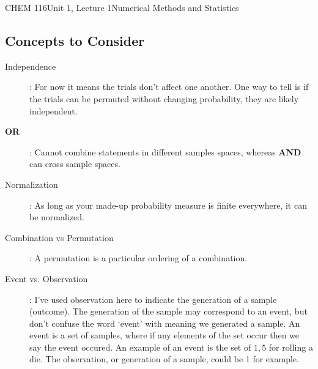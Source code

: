 \documentclass{article}
\begin{document}
\begin{tdoc}{CHEM 116}{Unit 1, Lecture 1}{Numerical Methods and Statistics}
\subsection{Concepts to Consider}

\begin{description}

\item [Independence]: For now it means the trials don't affect one
another. One way to tell is if the trials can be permuted without changing probability, they are likely
independent.\vspace{0.2cm}\\

\item[{\bf OR}]: Cannot combine statements in different samples spaces, whereas {\bf AND} can cross sample spaces.\vspace{0.2cm}\\

\item[Normalization]: As long as your made-up probability measure is
finite everywhere, it can be normalized.

\item[Combination vs Permutation]: A permutation is a particular
  ordering of a combination.

\item[Event vs. Observation]: I've used observation here to indicate
  the generation of a sample (outcome). The generation of the sample
  may correspond to an event, but don't confuse the word `event' with
  meaning we generated a sample. An event is a set of samples, where
  if any elements of the set occur then we say the event occured. An
  example of an event is the set of ${1,5}$ for rolling a die. The
  observation, or generation of a sample, could be 1 for example.

\end{description}

\end{tdoc}
\end{document}
